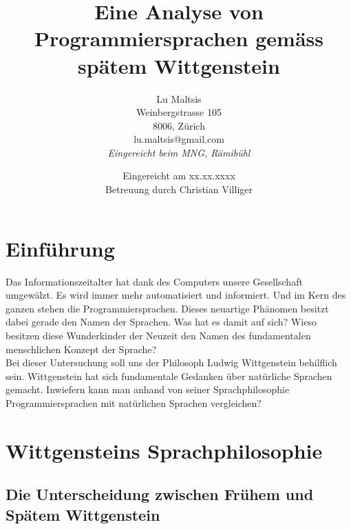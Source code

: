 \documentclass[a4paper,10pt]{article}
\begin{document}
\title{\Large{\textbf{Eine Analyse von Programmiersprachen gemäss spätem Wittgenstein}}}
\author{Lu Maltsis \\
Weinbergstrasse 105 \\
8006, Zürich \\
lu.maltsis@gmail.com \\
\textit{Eingereicht beim MNG, Rämibühl}
}
\date{Eingereicht am xx.xx.xxxx \\
\vspace{10mm}
Betreuung durch Christian Villiger}
\maketitle
\newpage

\setcounter{section}{-1}
\tableofcontents{}

\section{Einführung}
Das Informationszeitalter hat dank des Computers unsere Gesellschaft umgewälzt. Es wird immer mehr automatisiert und informiert. Und im Kern des ganzen stehen die Programmiersprachen. Dieses neuartige Phänomen besitzt dabei gerade den Namen der Sprachen. Was hat es damit auf sich? Wieso besitzen diese Wunderkinder der Neuzeit den Namen des fundamentalen menschlichen Konzept der Sprache? \\
Bei dieser Untersuchung soll uns der Philosoph Ludwig Wittgenstein behilflich sein. Wittgenstein hat sich fundamentale Gedanken über natürliche Sprachen gemacht. Inwiefern kann man anhand von seiner Sprachphilosophie Programmiersprachen mit natürlichen Sprachen vergleichen?


\section{Wittgensteins Sprachphilosophie}

\subsection{Die Unterscheidung zwischen Frühem und Spätem Wittgenstein}
\end{document}
